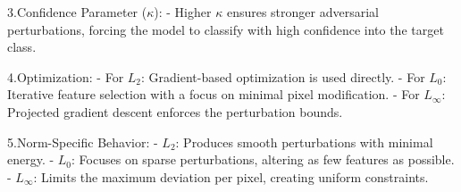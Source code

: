 3.Confidence Parameter ($\kappa$):
   - Higher $\kappa$ ensures stronger adversarial perturbations, forcing the model to classify with high confidence into the target class.

4.Optimization:
   - For $L_2$: Gradient-based optimization is used directly.
   - For $L_0$: Iterative feature selection with a focus on minimal pixel modification.
   - For $L_\infty$: Projected gradient descent enforces the perturbation bounds.

5.Norm-Specific Behavior:
   - $L_2$: Produces smooth perturbations with minimal energy.
   - $L_0$: Focuses on sparse perturbations, altering as few features as possible.
   - $L_\infty$: Limits the maximum deviation per pixel, creating uniform constraints.